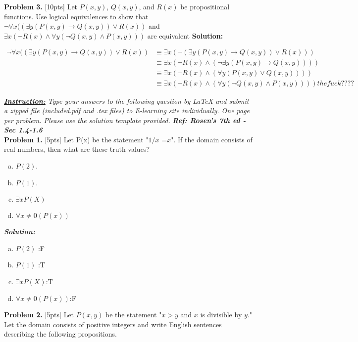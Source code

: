 \documentclass[10pt]{article}
\newcounter{problem}
\renewcommand{\implies}{\rightarrow}
\renewcommand{\lor}{\vee}
\renewcommand{\land}{\wedge}
\begin{document}
\clearpage
\textbf{Problem 3.} [10pts] Let $P(x,y)$, $Q(x,y)$, and $R(x)$ be propositional functions. Use logical equivalences to show that $\lnot \forall x((\exists y(P(x,y) \implies Q(x,y)) \lor R(x))$ and $\exists x(\lnot R(x) \land \forall y(\lnot Q(x,y) \land P(x,y)))$ are equivalent
\textbf{Solution:}
\begin{center}
  \begin{align*}
    \lnot \forall x((\exists y(P(x,y) \implies Q(x,y)) \lor R(x)) &\equiv \exists x(\lnot(\exists y(P(x,y) \implies Q(x,y)) \lor R(x)))\\
    &\equiv \exists x (\lnot R(x) \land (\lnot \exists y (P(x,y) \implies Q(x,y))))\\
    &\equiv \exists x (\lnot R(x) \land (\forall y (P(x,y) \lor
    Q(x,y))))\\
    &\equiv \exists x (\lnot R(x) \land (\forall y (\lnot Q(x,y) \land P(x,y))))
    the fuck ????
  \end{align*}
\end{center}
\pagestyle{fancyplain}
\textit{\textbf{\underline{Instruction:}} Type your answers to the following question by LaTeX and submit a zipped file (included.pdf and .tex files) to E-learning site individually. One page per problem. Please use the solution template provided.}
\textit{\textbf{Ref: Rosen's 7th ed - Sec 1.4-1.6}}\\
\textbf{Problem 1.} [5pts] Let P(x) be the statement "$1/x$ =$x$". If the domain consists of real numbers, then what are these truth values?\\
  \begin{enumerate}[a.]
    \item $P(2)$.
    \item $P(1)$.
    \item $\exists xP(X)$
    \item $\forall x\ne 0(P(x))$
  \end{enumerate}
\textit{\textbf{Solution:}}
  \begin{enumerate}[a.]
    \item $P(2)$ :F
    \item $P(1)$ :T
    \item $\exists xP(X)$:T
    \item $\forall x\ne 0(P(x))$:F
  \end{enumerate}
\clearpage
\textbf{Problem 2.} [5pts] Let $P(x,y)$ be the statement "$x>y$ and $x$ is divisible by $y$." Let the domain consists of positive integers and write English sentences describing the following propositions.
\end{document}
